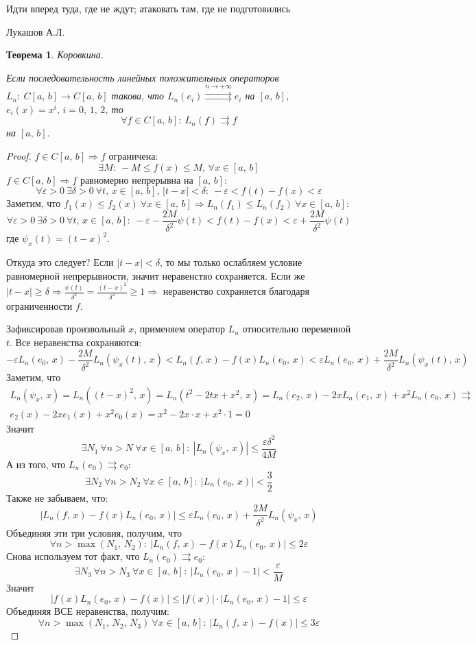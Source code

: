 \documentclass[a4paper,12pt]{article}
\renewcommand{\leq}{\ensuremath{\leqslant}}
\renewcommand{\geq}{\ensuremath{\geqslant}}
\theoremstyle{plain}
\newtheorem{theorem}{Теорема}[section]
\theoremstyle{definition}
\theoremstyle{remark}
\begin{document}
\epigraph{Идти вперед туда, где не ждут; атаковать там, где не подготовились}{Лукашов А.Л.}

\begin{theorem}
	Коровкина.

	Если последовательность линейных положительных операторов $L_n:\: C[a,\,b] \to C[a,\,b]$ такова, что $L_n(e_i) \stackrel{n \to +\infty}{\rightrightarrows} e_i$ на $[a,\,b]$, $e_i(x) = x^i,\, i = 0,\,1,\,2$, то
	\[\forall f \in C[a,\,b]:\: L_n(f) \rightrightarrows f\]
	на $[a,\,b]$.
\end{theorem}
\begin{proof}
	$f \in C[a,\,b] \Rightarrow f$ ограничена:
	\[\exists M:\: -M \leq f(x) \leq M,\, \forall x \in [a,\,b]\]
	$f \in C[a,\,b] \Rightarrow f$ равномерно непрерывна на $[a,\,b]$:
	\[\forall \varepsilon > 0 \: \exists \delta > 0 \: \forall t,\, x \in [a,\,b],\, |t - x| < \delta:\: -\varepsilon < f(t) - f(x) < \varepsilon\]
	Заметим, что $f_1(x) \leq f_2(x) \: \forall x \in [a,\,b] \Rightarrow L_n(f_1) \leq L_n(f_2) \: \forall x \in [a,\,b]$:
	\[\forall \varepsilon > 0 \: \exists \delta > 0 \: \forall t,\,x \in [a,\,b]:\: -\varepsilon - \frac{2M}{\delta^2}\psi(t) < f(t) - f(x) < \varepsilon + \frac{2M}{\delta^2}\psi(t)\]
	где $\psi_x(t) = (t - x)^2$.

	Откуда это следует? Если $|t - x| < \delta$, то мы только ослабляем условие равномерной непрерывности, значит неравенство сохраняется. Если же $|t - x| \geq \delta \Rightarrow \frac{\psi(t)}{\delta^2} = \frac{(t - x)^2}{\delta^2} \geq 1 \Rightarrow$ неравенство сохраняется благодаря ограниченности $f$.

	Зафиксировав произвольный $x$, применяем оператор $L_n$ относительно переменной $t$. Все неравенства сохраняются:
	\[-\varepsilon L_n(e_0,\, x) - \frac{2M}{\delta^2}L_n(\psi_x(t),\,x) < L_n(f,\,x) - f(x)L_n(e_0,\,x) < \varepsilon L_n(e_0,\, x) + \frac{2M}{\delta^2}L_n(\psi_x(t),\,x)\]
	Заметим, что
	\begin{align*}
		L_n(\psi_x,\,x) = L_n((t - x)^2,\,x) = L_n(t^2 - 2tx + x^2,\,x) = L_n(e_2,\,x) - 2xL_n(e_1,\,x) + x^2L_n(e_0,\,x) \rightrightarrows \\
		e_2(x) - 2xe_1(x) + x^2e_0(x) = x^2 - 2x\cdot x + x^2\cdot 1 = 0
	\end{align*}
	Значит
	\[\exists N_1 \: \forall n > N \: \forall x \in [a,\,b]:\: |L_n(\psi_x,\,x)| \leq \frac{\varepsilon\delta^2}{4M}\]
	А из того, что $L_n(e_0) \rightrightarrows e_0$:
	\[\exists N_2 \: \forall n > N_2 \: \forall x \in [a,\,b] :\: |L_n(e_0,\,x)| < \frac{3}{2}\]
	Также не забываем, что:
	\[|L_n(f,\,x) - f(x)L_n(e_0,\,x)| \leq \varepsilon L_n(e_0,\,x) + \frac{2M}{\delta^2}L_n(\psi_x,\,x)\]
	Объединяя эти три условия, получим, что
	\[\forall n > \max(N_1,\,N_2):\: |L_n(f,\,x) - f(x)L_n(e_0,\,x)| \leq 2\varepsilon\]
	Снова используем тот факт, что $L_n(e_0) \rightrightarrows e_0$:
	\[\exists N_3 \: \forall n > N_3 \: \forall x \in [a,\,b]:\: |L_n(e_0,\,x) - 1| < \frac{\varepsilon}{M}\]
	Значит
	\[|f(x)L_n(e_0,\,x) - f(x)| \leq |f(x)|\cdot|L_n(e_0,\,x) - 1| \leq \varepsilon\]
	Объединяя ВСЕ неравенства, получим:
	\[\forall n > \max(N_1,\,N_2,\,N_3) \: \forall x \in [a,\,b]:\: |L_n(f,\,x) - f(x)|\leq 3\varepsilon\]
\end{proof}
\end{document}
